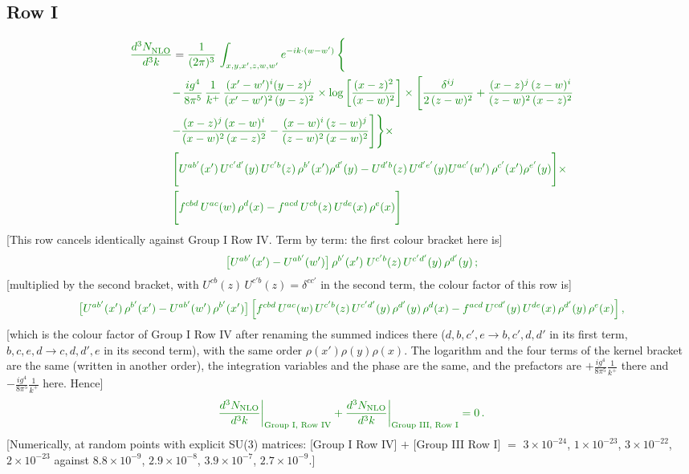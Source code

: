 \documentclass[9pt]{article}
\numberwithin{equation}{section}
\begin{document}
\subsection{Row I}
\begin{align}
     {\color{green!50!black}\frac{d^{3}N_{\rm NLO}^{\rm}}{d^{3}k}}  & = {\color{green!50!black}\frac{1}{(2\pi)^{3}}\, \int_{x,y,x',z,w,w^{\prime}} e^{-ik\cdot (w-w')}\, \Bigg\{}\notag \\
& {\color{green!50!black}-\,\frac{ig^{4}}{8\pi^{5}}\,\frac{1}{k^{+}}\,\frac{(x'-w')^{i}(y-z)^{j}}{(x'-w')^{2}\,(y-z)^{2}}\times \log{\left[\frac{(x-z)^{2}}{(x-w)^{2}}\right]}\times \Bigg[\frac{\delta^{ij}}{2\,(z-w)^{2}}+\frac{(x-z)^{j}\,(z-w)^{i}}{(z-w)^{2}\,(x-z)^{2}}}\notag \\ & {\color{green!50!black}-\frac{(x-z)^{j}\,(x-w)^{i}}{(x-w)^{2}\,(x-z)^{2}}-\frac{(x-w)^{i}\,(z-w)^{j}}{(z-w)^{2}\,(x-w)^{2}}\Bigg]\Bigg\}\times} \notag \\ &  {\color{green!50!black}\Bigg[U^{ab'}(x')\,U^{c'd'}(y)\,U^{c'b}(z)\,\rho^{b'}(x')\rho^{d'}(y)-U^{d'b}(z)\,U^{d'e'}(y)U^{ac'}(w')\,\rho^{c'}(x')\rho^{e'}(y)\Bigg]\times}\notag \\ & {\color{green!50!black}\Bigg[f^{cbd}\,U^{ac}(w)\,\rho^{d}(x)-f^{acd}\, U^{cb}(z)\,U^{de}(x)\,\rho^{e}(x)\Bigg]}
\end{align}
{\color{green!50!black}[This row cancels identically against Group I Row IV. Term by term: the first colour bracket here is]}
\begin{align}
{\color{green!50!black}\big[U^{ab'}(x')-U^{ab'}(w')\big]\,\rho^{b'}(x')\;U^{c'b}(z)\,U^{c'd'}(y)\,\rho^{d'}(y)\,;}\notag
\end{align}
{\color{green!50!black}[multiplied by the second bracket, with $U^{cb}(z)\,U^{c'b}(z)=\delta^{cc'}$ in the second term, the colour factor of this row is]}
\begin{align}
{\color{green!50!black}\big[U^{ab'}(x')\,\rho^{b'}(x')-U^{ab'}(w')\,\rho^{b'}(x')\big]\,\Big[f^{cbd}\,U^{ac}(w)\,U^{c'b}(z)\,U^{c'd'}(y)\,\rho^{d'}(y)\,\rho^{d}(x)-f^{acd}\,U^{cd'}(y)\,U^{de}(x)\,\rho^{d'}(y)\,\rho^{e}(x)\Big]\,,}\notag
\end{align}
{\color{green!50!black}[which is the colour factor of Group I Row IV after renaming the summed indices there ($d,b,c',e\to b,c',d,d'$ in its first term, $b,c,e,d\to c,d,d',e$ in its second term), with the same order $\rho(x')\rho(y)\rho(x)$. The logarithm and the four terms of the kernel bracket are the same (written in another order), the integration variables and the phase are the same, and the prefactors are $+\frac{ig^{4}}{8\pi^{5}}\frac{1}{k^{+}}$ there and $-\frac{ig^{4}}{8\pi^{5}}\frac{1}{k^{+}}$ here. Hence]}
\begin{align}
{\color{green!50!black}\frac{d^{3}N_{\rm NLO}}{d^{3}k}\bigg|_{\text{Group I, Row IV}}+\frac{d^{3}N_{\rm NLO}}{d^{3}k}\bigg|_{\text{Group III, Row I}}=0\,.}\notag
\end{align}
{\color{green!50!black}[Numerically, at random points with explicit SU(3) matrices: [Group I Row IV] $+$ [Group III Row I] $=$ $3\times10^{-24}$, $1\times10^{-23}$, $3\times10^{-22}$, $2\times10^{-23}$ against $8.8\times10^{-9}$, $2.9\times10^{-8}$, $3.9\times10^{-7}$, $2.7\times10^{-9}$.]}
\par\noindent
\end{document}
